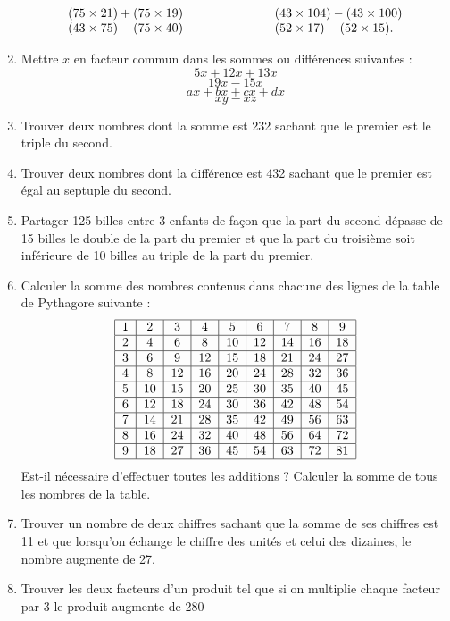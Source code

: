 \documentclass[12 pt]{report}
\theoremstyle{plain}
\newcounter{n}
\begin{document}
\begin{enumerate}
\[\begin{tabular}{lll}
$(75 \times 21) + (75 \times 19)$ &\phantom{meowmeow}& 
$(43 \times 104) - (43 \times 100)$\\
$(43 \times 75) - (75 \times 40)$ &\phantom{meowmeow}& $(52 \times 17) - (52 \times 15)$.
\end{tabular}
\]
\item Mettre $x$ en facteur commun dans les sommes ou différences suivantes : 
\[ 5x + 12x + 13x\]
\[19x - 15x\]
\[ax + bx + cx + dx\]
\[xy - xz\]
\item Trouver deux nombres dont la somme est 232 sachant que le premier est le triple du second.
\item Trouver deux nombres dont la différence est 432
sachant que le premier est égal au septuple du second.
\item Partager 125 billes entre 3 enfants de façon que la part du second dépasse de 15 billes le double de 
la part du premier et que la part du troisième soit inférieure de 10 billes au triple de la part du premier. 
\item Calculer la somme des nombres contenus dans chacune des lignes de la table de Pythagore suivante : 
\[\begin{tabular}{| c | c | c | c | c | c | c | c | c |}
\hline
1 & 2 & 3 & 4 & 5 & 6 & 7 & 8 & 9 \\ \hline
2 & 4 & 6 & 8 & 10 & 12 & 14 & 16 & 18 \\ \hline
3 & 6 & 9 & 12 & 15 & 18 & 21 & 24 & 27 \\ \hline
4 & 8 & 12 & 16 & 20 & 24 & 28 & 32 & 36 \\ \hline
5 & 10 & 15 & 20 & 25 & 30 & 35 & 40 & 45 \\ \hline
6 & 12 & 18 & 24 & 30 & 36 & 42 & 48 & 54 \\ \hline
7 & 14 & 21  & 28 & 35 & 42 & 49 & 56 & 63 \\ \hline
8 & 16 & 24 & 32 & 40 & 48 & 56 & 64 & 72 \\ \hline
9 & 18 & 27 & 36 & 45 & 54 & 63 & 72 & 81 \\ \hline \end{tabular}\]
Est-il nécessaire d'effectuer toutes les additions ? 
Calculer la somme de tous les nombres de la table. 
\item Trouver un nombre de deux chiffres sachant que la somme de ses chiffres est 11 et que lorsqu'on échange le chiffre des unités et celui des dizaines,
le nombre augmente de 27. 
\item Trouver les deux facteurs d'un produit tel que si on multiplie chaque facteur par 3 le produit augmente de 280

\end{enumerate}
\end{document}
